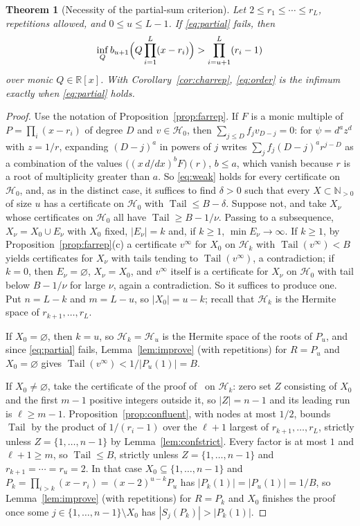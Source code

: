 \documentclass[11pt]{article}
\newtheorem{theorem}{Theorem}[section]
\theoremstyle{definition}
\theoremstyle{plain}
\newcommand{\R}{\mathbb R}
\newcommand{\N}{\mathbb N}
\DeclareMathOperator{\Tail}{Tail}
\begin{document}
\begin{theorem}[Necessity of the partial-sum criterion]\label{thm:converse}
Let $2\le r_1\le\cdots\le r_L$, repetitions allowed, and $0\le u\le L-1$.  If
\eqref{eq:partial} fails, then
\[
  \inf_Qb_{u+1}\Bigl(Q\prod_{i=1}^L(x-r_i)\Bigr)>\prod_{i=u+1}^L(r_i-1)
\]
over monic $Q\in\R[x]$.  With Corollary~\ref{cor:charrep},
\eqref{eq:order} is the infimum exactly when \eqref{eq:partial} holds.
\end{theorem}

\begin{proof}
Use the notation of Proposition~\ref{prop:farrep}.  If $F$ is a monic
multiple of $P=\prod_i(x-r_i)$ of degree $D$ and $v\in\mathcal H_0$, then
$\sum_{j\le D}f_jv_{D-j}=0$: for $\psi=d^az^d$ with $z=1/r$, expanding
$(D-j)^a$ in powers of $j$ writes $\sum_jf_j(D-j)^ar^{j-D}$ as a combination
of the values $\bigl((x\,d/dx)^bF\bigr)(r)$, $b\le a$, which vanish because
$r$ is a root of multiplicity greater than $a$.  So \eqref{eq:weak} holds
for every certificate on $\mathcal H_0$, and, as in the distinct case, it
suffices to find $\delta>0$ such that every $X\subset\N_{>0}$ of size $u$ has
a certificate on $\mathcal H_0$ with $\Tail\le B-\delta$.  Suppose not, and
take $X_\nu$ whose certificates on $\mathcal H_0$ all have
$\Tail\ge B-1/\nu$.  Passing to a subsequence, $X_\nu=X_0\cup E_\nu$ with
$X_0$ fixed, $|E_\nu|=k$ and, if $k\ge1$, $\min E_\nu\to\infty$.  If
$k\ge1$, by Proposition~\ref{prop:farrep}(c) a certificate $v^\infty$ for $X_0$ on
$\mathcal H_k$ with $\Tail(v^\infty)<B$ yields certificates for $X_\nu$
with tails tending to $\Tail(v^\infty)$, a contradiction; if $k=0$, then
$E_\nu=\varnothing$, $X_\nu=X_0$, and $v^\infty$ itself is a certificate for
$X_\nu$ on $\mathcal H_0$ with tail below $B-1/\nu$ for large $\nu$, again a
contradiction.  So it suffices to produce one.  Put
$n=L-k$ and $m=L-u$, so $|X_0|=u-k$; recall that $\mathcal H_k$ is the
Hermite space of $r_{k+1},\ldots,r_L$.

If $X_0=\varnothing$, then $k=u$, so $\mathcal H_k=\mathcal H_u$ is the Hermite space of the roots of $P_u$, and
since \eqref{eq:partial} fails, Lemma~\ref{lem:improve} (with repetitions)
for $R=P_u$ and $X_0=\varnothing$ gives $\Tail(v^\infty)<1/|P_u(1)|=B$.

If $X_0\ne\varnothing$, take the certificate of the proof of~\cite[Lemma~3.1]{coefficient-mass}
on $\mathcal H_k$:
zero set $Z$ consisting of $X_0$ and the first $m-1$ positive integers
outside it, so $|Z|=n-1$ and its leading run is $\ell\ge m-1$.
Proposition~\ref{prop:confluent}, with nodes at most $1/2$, bounds $\Tail$ by
the product of $1/(r_i-1)$ over the $\ell+1$ largest of $r_{k+1},\ldots,r_L$,
strictly unless $Z=\{1,\ldots,n-1\}$ by Lemma~\ref{lem:confstrict}.  Every
factor is at most $1$ and $\ell+1\ge m$, so $\Tail\le B$, strictly unless
$Z=\{1,\ldots,n-1\}$ and $r_{k+1}=\cdots=r_u=2$.  In that case
$X_0\subseteq\{1,\ldots,n-1\}$ and $P_k=\prod_{i>k}(x-r_i)=(x-2)^{u-k}P_u$
has $|P_k(1)|=|P_u(1)|=1/B$, so Lemma~\ref{lem:improve} (with repetitions) for
$R=P_k$ and $X_0$ finishes the proof once some $j\in\{1,\ldots,n-1\}\setminus X_0$
has $|S_j(P_k)|>|P_k(1)|$.


\end{proof}
\end{document}
